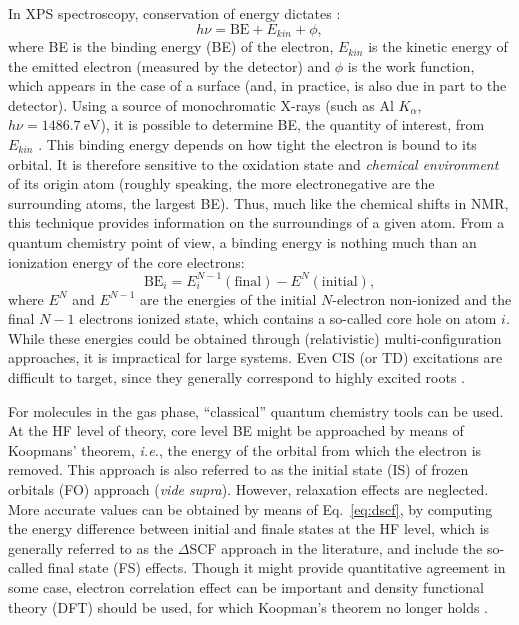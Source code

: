 \documentclass[12pt,a4paper]{article}
\begin{document}
In XPS spectroscopy, conservation of energy dictates :\begin{equation}
	h\nu =\text{BE} + E_{kin} + \phi, \label{eq:xps}
\end{equation}
where BE  is the binding energy (BE) of the electron, $E_{kin}$ is the kinetic energy of the emitted electron (measured by the detector) and $\phi$ is the work function, which appears in the case of a surface (and, in practice, is also due in part to the detector). Using a source of monochromatic X-rays (such as Al $K_\alpha$, $h\nu = \SI{1486.7}{\electronvolt}$), it is possible to determine BE, the quantity of interest, from $E_{kin}$ \cite{vinesPredictionCoreLevel2018}.
This binding energy depends on how tight the electron is bound to its orbital. It is therefore sensitive to the oxidation state and \textit{chemical environment} of its origin atom (roughly speaking, the more electronegative are the surrounding atoms, the largest BE). Thus, much like the chemical shifts in NMR, this technique provides information on the surroundings of a given atom. 
From a quantum chemistry point of view, a binding energy is nothing much than an ionization energy of the core electrons:\begin{equation}
	\text{BE}_i = E^{N-1}_i(\text{final}) - E^{N}(\text{initial}), \label{eq:dscf}
\end{equation}
where $E^{N}$ and $E^{N-1}$ are the energies of the initial $N$-electron non-ionized and the final $N-1$ electrons ionized state, which contains a so-called core hole on atom $i$. While these energies could be obtained through (relativistic) multi-configuration approaches, it is impractical for large systems. Even CIS (or TD) excitations are difficult to target, since they generally correspond to highly excited roots  \cite{vinesPredictionCoreLevel2018}.

For molecules in the gas phase, ``classical'' quantum chemistry tools can be used. At the HF level of theory, core level BE might be approached by means of Koopmans' theorem, \textit{i.e.}, the energy of the orbital from which the electron is removed. This approach is also referred to as the initial state (IS) of frozen orbitals (FO) approach (\textit{vide supra}). However, relaxation effects are neglected. More accurate values can be obtained by means of Eq.~\eqref{eq:dscf}, by computing the energy difference between initial and finale states at the HF level, which is generally referred to as the $\Delta$SCF approach in the literature, and include the so-called final state (FS) effects.	Though it might provide quantitative agreement in some case, electron correlation effect can be important and density functional theory (DFT) should be used, for which Koopman's theorem no longer holds \cite{pueyobellafontPredictingCoreLevel2017}.
\end{document}
